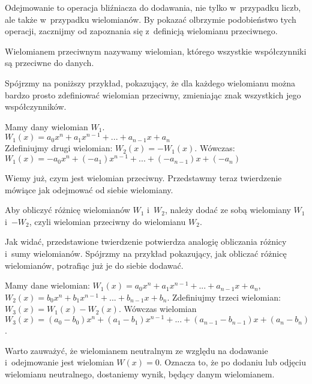 Odejmowanie to operacja bliźniacza do dodawania, nie tylko w~przypadku liczb, ale także w~przypadku wielomianów. By pokazać olbrzymie podobieństwo tych operacji, zacznijmy od zapoznania się z~definicją wielomianu przeciwnego.

\begin{definition}
	$ $\\
	Wielomianem przeciwnym nazywamy wielomian, którego wszystkie współczynniki są przeciwne do danych.
\end{definition}

Spójrzmy na poniższy przykład, pokazujący, że dla każdego wielomianu można bardzo prosto zdefiniować wielomian przeciwny, zmieniając znak wszystkich jego współczynników.

\begin{example}
	$ $\\
	Mamy dany wielomian $W_1$. \\
	$W_1(x) = a_0x^n + a_1x^{n-1} + ... + a_{n-1}x + a_n$ \\
	Zdefiniujmy drugi wielomian: $W_2(x) = -W_1(x)$. Wówczas: \\
	$W_1(x) = -a_0x^n + (-a_1)x^{n-1} + ... + (-a_{n-1})x + (-a_n)$
\end{example}

Wiemy już, czym jest wielomian przeciwny. Przedstawmy teraz twierdzenie mówiące jak odejmować od siebie wielomiany.

\begin{theorem}
	$ $\\
	Aby obliczyć różnicę wielomianów $W_1$ i~$W_2$, należy dodać ze sobą wielomiany $W_1$ i~$-W_2$, czyli wielomian przeciwny do wielomianu $W_2$.
\end{theorem}

Jak widać, przedstawione twierdzenie potwierdza analogię obliczania różnicy i~sumy wielomianów. Spójrzmy na przykład pokazujący, jak obliczać różnicę wielomianów, potrafiąc już je do siebie dodawać.

\begin{example}
	$ $\\
	Mamy dane wielomian: $W_1(x) = a_0x^n + a_1x^{n-1} + ... + a_{n-1}x + a_n$, $W_2(x) = b_0x^n + b_1x^{n-1} + ... + b_{n-1}x + b_n$. Zdefiniujmy trzeci wielomian: $W_3(x) = W_1(x) - W_2(x)$. Wówczas wielomian $W_3(x) = (a_0-b_0)x^n + (a_1-b_1)x^{n-1} + ... + (a_{n-1} - b_{n-1})x + (a_n - b_n)$.
\end{example}

Warto zauważyć, że wielomianem neutralnym ze względu na dodawanie i~odejmowanie jest wielomian $W(x)=0$. Oznacza to, że po dodaniu lub odjęciu wielomianu neutralnego, dostaniemy wynik, będący danym wielomianem.

